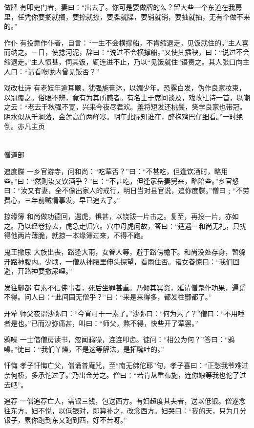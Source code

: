 \documentclass[12pt,UTF8]{ctexbook}
\begin{document}
做牌
有叩吏门者，妻曰：“出去了。你可是要做牌的么？留大些一个东道在我房里，任凭你要搁就搁，要捺就捺，要牒就牒，要销就销，要抽就抽，无有个做不来的。”

作仆
有投靠作仆者，自言：“一生不会横撑船，不肯缩退走，见饭就住的。”主人喜而纳之。一日，使捻河泥，辞曰：“说过不会横撑船。”又使其插秧，曰：“说过不会缩退走。”主人愤甚，伺其饭，辄连进不止，乃以“见饭就住”语责之。其人张口向主人曰：“请看喉咙内曾见饭否？”

戏改杜诗
有老妓年逾耳顺，犹强施膏沐，以媚少年。恐露白发，伪作良家妆束，以冠覆之。俗眼不辨，竟有为其所惑者。有名士于席间谈及，戏改杜诗一首，以嘲之云：“老去千秋强不宽，兴来今夜尽君欢。羞将短发还桃鬓，笑学良家也带冠。阴水似从千涧落，金莲高耸两峰寒。明年此际知谁在，醉抱鸡巴仔细看。”一时绝倒。亦凡主页

\part{}

僧道部

追度牒
一乡官游寺，问和尚：“吃荤否？”曰：“不甚吃，但逢饮酒时，略用些。”曰：“然则汝又饮酒乎？”曰：“不甚吃，但逢家岳妻舅来，略陪些。”乡官怒曰：“汝又有妻，全不像出家人的戒行，明日当对县官说，追你度牒。”僧曰﹔“不劳费心，三年前贼情事发，早已追去了。”

掠缘簿
和尚做功德回，遇虎，惧甚，以铙钹一片击之。复至，再投一片，亦如之。乃以经卷掠去，虎急走归穴。穴中母虎问故，答曰：“适遇一和尚无礼，只扰得他两片薄脆，就掠一本缘簿过来，不得不跑。

鬼王撒尿
大族出丧，路逢大雨，女眷人等，避于路傍檐下。和尚没处存身，暂躲开路神腹内。少顷，一僧从神腰里伸头探望，看雨住否。诸女眷惊曰：“我们回避，开路神要撒尿哩。”

发往酆都
有素不信佛事者，死后坐罪甚重。乃倾其冥资，延请僧鬼作功果，遍觅不得。问人曰：“此间固无僧乎？”曰：“来是来得多，都发往酆都了。”

开荤
师父夜谓沙弥曰：“今宵可干一素了。”沙弥曰：“何为素了？”僧曰：“不用唾者是也。”已而沙弥痛甚，叫曰：“师父，熬不得，快些开了荤罢。”

鸦噪
一士借僧房读书，忽闻鸦噪，连连叩齿。徒问：“相公为何？”答曰：“鸦噪。”徒曰：“我们丫燥，不是这等解法，是拓嚵吐的。”

忏悔
孝子忏悔亡父，僧诵普庵咒，至“南无佛佗耶”句，孝子喜曰：“正愁我爷难过奈何桥，多承佗过了。”乃出金劳之。僧曰：“若肯从重布施，连你娘等我也佗了过去吧”。

追荐
一僧追荐亡人，需银三钱，包送西方。有妇超度其夫者，送以低银。僧遂念往东方。妇不悦，以低银对，即算补之，改念西方。妇哭曰：“我的天，只为几分银子，累你跑到东又跑到西，好不苦呀。”
\end{document}
